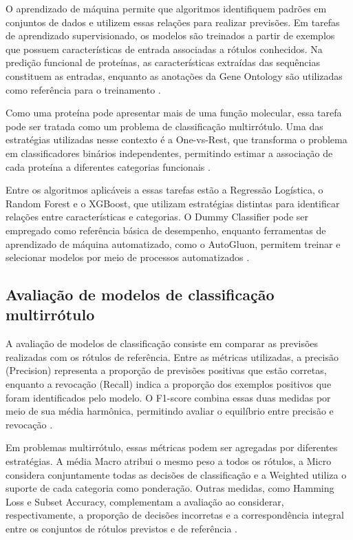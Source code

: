 O aprendizado de máquina permite que algoritmos identifiquem padrões em conjuntos de dados e utilizem essas relações para realizar previsões. Em tarefas de aprendizado supervisionado, os modelos são treinados a partir de exemplos que possuem características de entrada associadas a rótulos conhecidos. Na predição funcional de proteínas, as características extraídas das sequências constituem as entradas, enquanto as anotações da Gene Ontology são utilizadas como referência para o treinamento \cite{hastie2009,bonetta2020}.

Como uma proteína pode apresentar mais de uma função molecular, essa tarefa pode ser tratada como um problema de classificação multirrótulo. Uma das estratégias utilizadas nesse contexto é a One-vs-Rest, que transforma o problema em classificadores binários independentes, permitindo estimar a associação de cada proteína a diferentes categorias funcionais \cite{zhangzhou2014}.

Entre os algoritmos aplicáveis a essas tarefas estão a Regressão Logística, o Random Forest e o XGBoost, que utilizam estratégias distintas para identificar relações entre características e categorias. O Dummy Classifier pode ser empregado como referência básica de desempenho, enquanto ferramentas de aprendizado de máquina automatizado, como o AutoGluon, permitem treinar e selecionar modelos por meio de processos automatizados \cite{breiman2001,chen2016,erickson2020}.


\subsection{Avaliação de modelos de classificação multirrótulo}
\label{subsec:avaliacao-multirrótulo}

A avaliação de modelos de classificação consiste em comparar as previsões realizadas com os rótulos de referência. Entre as métricas utilizadas, a precisão (Precision) representa a proporção de previsões positivas que estão corretas, enquanto a revocação (Recall) indica a proporção dos exemplos positivos que foram identificados pelo modelo. O F1-score combina essas duas medidas por meio de sua média harmônica, permitindo avaliar o equilíbrio entre precisão e revocação \cite{sokolova2009}.

Em problemas multirrótulo, essas métricas podem ser agregadas por diferentes estratégias. A média Macro atribui o mesmo peso a todos os rótulos, a Micro considera conjuntamente todas as decisões de classificação e a Weighted utiliza o suporte de cada categoria como ponderação. Outras medidas, como Hamming Loss e Subset Accuracy, complementam a avaliação ao considerar, respectivamente, a proporção de decisões incorretas e a correspondência integral entre os conjuntos de rótulos previstos e de referência \cite{zhangzhou2014}.

